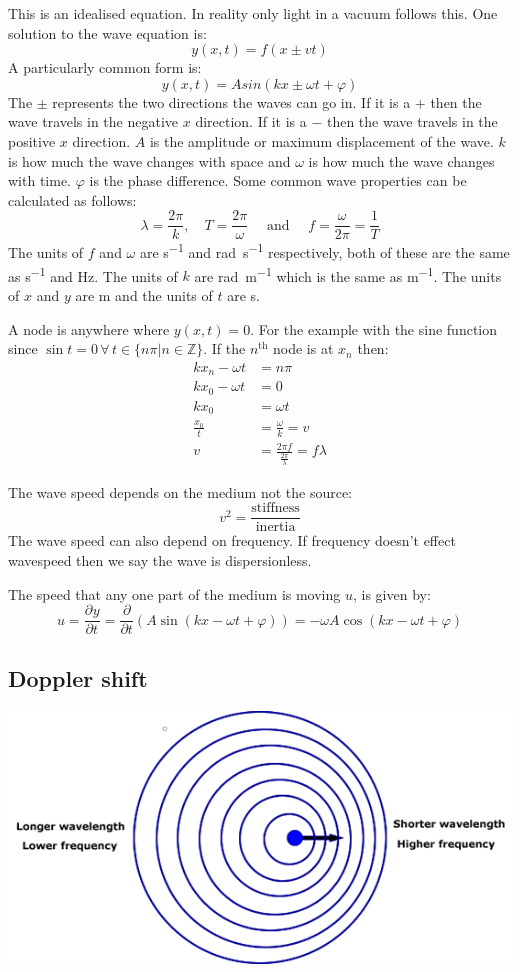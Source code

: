 \documentclass{article}
\newcommand{\pd}[3][]{\frac{\partial^{#1}{#2}}{\partial{#3}^{#1}}}
\newcommand{\A}{\forall\,}
\newcommand{\bb}[1]{\mathbb{#1}}
\begin{document}
This is an idealised equation. In reality only light in a vacuum follows this. One solution to the wave equation is:
\[y(x,t)=f(x\pm vt)\]
A particularly common form is:
\[y(x,t)=Asin(kx\pm\omega t+\varphi)\]
The \(\pm\) represents the two directions the waves can go in. If it is a \(+\) then the wave travels in the negative \(x\) direction. If it is a \(-\) then the wave travels in the positive \(x\) direction. \(A\) is the amplitude or maximum displacement of the wave. \(k\) is how much the wave changes with space and \(\omega\) is how much the wave changes with time. \(\varphi\) is the phase difference. Some common wave properties can be calculated as follows:
\[\lambda=\frac{2\pi}{k},\quad T=\frac{2\pi}{\omega}\quad\text{ and }\quad f=\frac{\omega}{2\pi}=\frac 1T\]
The units of \(f\) and \(\omega\) are \si{s^{-1}} and \si{rad.s^{-1}} respectively, both of these are the same as \si{s^{-1}} and \si{Hz}. The units of \(k\) are \si{rad.m^{-1}} which is the same as \si{m^{-1}}. The units of \(x\) and \(y\) are \si{m} and the units of \(t\) are \si{s}.

A node is anywhere where \(y(x,t)=0\). For the example with the sine function since \(\sin t=0\,\A t\in\{n\pi|n\in\bb Z\}\). If the \(n^{\text{th}}\) node is at \(x_n\) then:
\begin{align*}
kx_n-\omega t&=n\pi\\
kx_0-\omega t&=0\\
kx_0&=\omega t\\
\frac{x_0}{t}&=\frac{\omega}{k}=v\\
v&=\frac{2\pi f}{\frac{2\pi}{\lambda}}=f\lambda
\end{align*}

The wave speed depends on the medium not the source:
\[v^2=\frac{\text{stiffness}}{\text{inertia}}\]
The wave speed can also depend on frequency. If frequency doesn't effect wavespeed then we say the wave is dispersionless. 

The speed that any one part of the medium is moving \(u\), is given by:
\[u=\pd yt=\frac{\partial}{\partial t}(A\sin(kx-\omega t+\varphi))=-\omega A\cos(kx-\omega t+\varphi)\]

\subsection*{Doppler shift}

\begin{center}
\includegraphics[scale=0.4]{Doppler}
\end{center}
\end{document}
